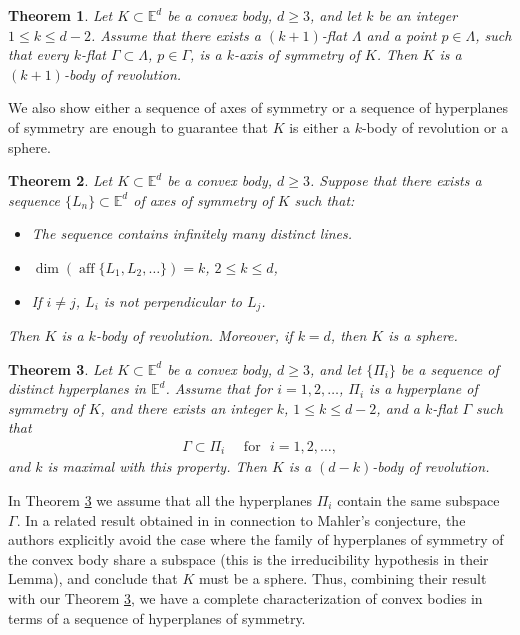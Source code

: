 \documentclass[12pt,thmsa]{amsart}
\newcommand{\Ed}{\mathbb{E}^{d}}
\newcommand{\aff}{\operatorname*{aff}}
\newtheorem{theorem}{Theorem}
\begin{document}
\begin{theorem}\label{copaoro}
Let $K\subset \Ed$ be a  convex body, $d\geq 3$, and let $k$ be an integer $1\leq k \leq d-2$. Assume that there exists a $(k+1)$-flat $\Lambda$ and a point $p\in \Lambda$, such that every $k$-flat $\Gamma \subset \Lambda$, $p\in \Gamma$, is a $k$-axis of symmetry of $K$. Then $K$ is a  $(k+1)$-body of revolution.
\end{theorem}



 We also show either a sequence of axes of symmetry or a sequence of hyperplanes of symmetry are enough to guarantee that $K$ is either a $k$-body of revolution or a sphere. 

\begin{theorem}\label{dream}
Let $K\subset \Ed$ be a convex body, $d\geq 3$. Suppose that there exists a  sequence $\{L_n\}\subset \Ed $ of axes of symmetry of $K$ such that:
\begin{itemize}
\item [(i)]  The sequence contains infinitely many distinct lines.
\item [(ii)] $\dim(\aff\{L_1,L_2,\ldots\}) =k$, $2\leq k \leq d$,
\item [(iii)]  If $i\not=j$, $L_i$ is not perpendicular to $L_j$.
\end{itemize}
Then %
$K$ is a $k$-body of revolution. Moreover, if $k=d$, then $K$ is a sphere.
 \end{theorem}

\begin{theorem}\label{fantasia}
Let $K\subset \Ed$ be a convex body, $d\geq 3$, and let $\{\Pi_i\}$ be a sequence of distinct hyperplanes in 
$\Ed$. Assume that for $i=1,2,\ldots$, $\Pi_i$ is a hyperplane of symmetry of $K$, and there exists an integer $k$, $1\leq k \leq d-2$, and a $k$-flat $\Gamma$ such that 
\begin{eqnarray}\label{miami}
\Gamma \subset \Pi_i  \textrm{ }\textrm{ } \textrm{for} \textrm{ } i=1,2,\ldots,
\end{eqnarray}
 and $k$ is maximal with this property.  %
 Then $K$ is a $(d-k)$-body of revolution.
\end{theorem}

In Theorem \ref{fantasia} we assume that all the hyperplanes $\Pi_i$ contain the same subspace $\Gamma$. In a  related result  obtained in \cite[Lemma 18]{barthe} in connection to  Mahler's conjecture,  the authors explicitly avoid the case where the family of hyperplanes of symmetry of the convex body share a subspace (this is the irreducibility hypothesis in their Lemma), and conclude that $K$ must be a sphere. Thus, combining their result with our Theorem \ref{fantasia}, we have a  complete  characterization of convex bodies in terms of a sequence of hyperplanes of symmetry. 
\end{document}
